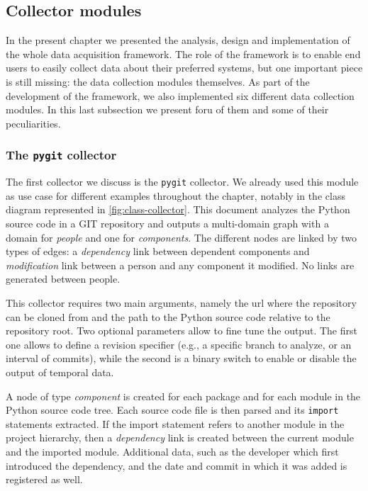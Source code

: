 \subsection{Collector modules}

In the present chapter we presented the analysis, design and implementation of the whole data acquisition framework. The role of the framework is to enable end users to easily collect data about their preferred systems, but one important piece is still missing: the data collection modules themselves. As part of the development of the framework, we also implemented six different data collection modules. In this last subsection we present foru of them and some of their peculiarities.

\subsubsection{The \texttt{pygit} collector}

The first collector we discuss is the \texttt{pygit} collector. We already used this module as use case for different examples throughout the chapter, notably in the class diagram represented in \vref{fig:class-collector}. This document analyzes the Python source code in a GIT repository \cite{git} and outputs a multi-domain graph with a domain for \emph{people} and one for \emph{components}. The different nodes are linked by two types of edges: a \emph{dependency} link between dependent components and \emph{modification} link between a person and any component it modified. No links are generated between people.

This collector requires two main arguments, namely the \gls{url} where the repository can be cloned from and the path to the Python source code relative to the repository root. Two optional parameters allow to fine tune the output. The first one allows to define a revision specifier (e.g., a specific branch to analyze, or an interval of commits), while the second is a binary switch to enable or disable the output of temporal data.

A node of type \emph{component} is created for each package and for each module in the Python source code tree. Each source code file is then parsed and its \texttt{import} statements extracted. If the import statement refers to another module in the project hierarchy, then a \emph{dependency} link is created between the current module and the imported module. Additional data, such as the developer which first introduced the dependency, and the date and commit in which it was added is registered as well.

